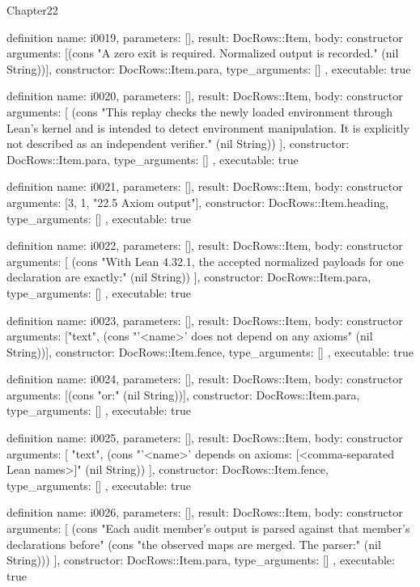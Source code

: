 \begin{lexlean}{Chapter22}
\begin{semanticmodule}
definition{
  name: i0019,
  parameters: [],
  result: DocRows::Item,
  body: constructor{
    arguments: [(cons "A zero exit is required. Normalized output is recorded." (nil String))],
    constructor: DocRows::Item.para,
    type_arguments: []
  },
  executable: true
}

definition{
  name: i0020,
  parameters: [],
  result: DocRows::Item,
  body: constructor{
    arguments: [
      (cons "This replay checks the newly loaded environment through Lean's kernel and is intended to detect environment manipulation. It is explicitly not described as an independent verifier." (nil String))
    ],
    constructor: DocRows::Item.para,
    type_arguments: []
  },
  executable: true
}

definition{
  name: i0021,
  parameters: [],
  result: DocRows::Item,
  body: constructor{
    arguments: [3, 1, "22.5 Axiom output"],
    constructor: DocRows::Item.heading,
    type_arguments: []
  },
  executable: true
}

definition{
  name: i0022,
  parameters: [],
  result: DocRows::Item,
  body: constructor{
    arguments: [
      (cons "With Lean 4.32.1, the accepted normalized payloads for one declaration are exactly:" (nil String))
    ],
    constructor: DocRows::Item.para,
    type_arguments: []
  },
  executable: true
}

definition{
  name: i0023,
  parameters: [],
  result: DocRows::Item,
  body: constructor{
    arguments: ["text", (cons "'<name>' does not depend on any axioms" (nil String))],
    constructor: DocRows::Item.fence,
    type_arguments: []
  },
  executable: true
}

definition{
  name: i0024,
  parameters: [],
  result: DocRows::Item,
  body: constructor{
    arguments: [(cons "or:" (nil String))],
    constructor: DocRows::Item.para,
    type_arguments: []
  },
  executable: true
}

definition{
  name: i0025,
  parameters: [],
  result: DocRows::Item,
  body: constructor{
    arguments: [
      "text",
      (cons "'<name>' depends on axioms: [<comma-separated Lean names>]" (nil String))
    ],
    constructor: DocRows::Item.fence,
    type_arguments: []
  },
  executable: true
}

definition{
  name: i0026,
  parameters: [],
  result: DocRows::Item,
  body: constructor{
    arguments: [
      (cons "Each audit member's output is parsed against that member's declarations before" (cons "the observed maps are merged. The parser:" (nil String)))
    ],
    constructor: DocRows::Item.para,
    type_arguments: []
  },
  executable: true
}


\end{semanticmodule}
\end{lexlean}
